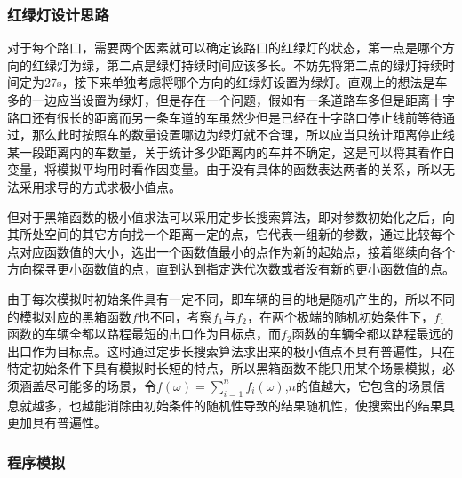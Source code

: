 \documentclass[a4paper,12pt]{article}
\numberwithin{equation}{section}
\newcommand{\upcite}[1]{\textsuperscript{\textsuperscript{\cite{#1}}}}
\begin{document}
		\subsubsection{红绿灯设计思路}
		
		对于每个路口，需要两个因素就可以确定该路口的红绿灯的状态，第一点是哪个方向的红绿灯为绿，第二点是绿灯持续时间应该多长。不妨先将第二点的绿灯持续时间定为27s，接下来单独考虑将哪个方向的红绿灯设置为绿灯。直观上的想法是车多的一边应当设置为绿灯，但是存在一个问题，假如有一条道路车多但是距离十字路口还有很长的距离而另一条车道的车虽然少但是已经在十字路口停止线前等待通过，那么此时按照车的数量设置哪边为绿灯就不合理，所以应当只统计距离停止线某一段距离内的车数量，关于统计多少距离内的车并不确定，这是可以将其看作自变量，将模拟平均用时看作因变量。由于没有具体的函数表达两者的关系，所以无法采用求导的方式求极小值点。\par
%
		但对于黑箱函数的极小值求法可以采用定步长搜索算法，即对参数初始化之后，向其所处空间的其它方向找一个距离一定的点，它代表一组新的参数，通过比较每个点对应函数值的大小，选出一个函数值最小的点作为新的起始点，接着继续向各个方向探寻更小函数值的点，直到达到指定迭代次数或者没有新的更小函数值的点\upcite{ref9}。\par
		由于每次模拟时初始条件具有一定不同，即车辆的目的地是随机产生的，所以不同的模拟对应的黑箱函数$f$也不同，考察$f_1$与$f_2$，在两个极端的随机初始条件下，$f_1$函数的车辆全都以路程最短的出口作为目标点，而$f_2$函数的车辆全都以路程最远的出口作为目标点。这时通过定步长搜索算法求出来的极小值点不具有普遍性，只在特定初始条件下具有模拟时长短的特点，所以黑箱函数不能只用某个场景模拟，必须涵盖尽可能多的场景，令$f(\omega)=\sum_{i=1}^{n}f_i(\omega)$,$n$的值越大，它包含的场景信息就越多，也越能消除由初始条件的随机性导致的结果随机性，使搜索出的结果具更加具有普遍性。
		\subsubsection{程序模拟}
		
\end{document}
